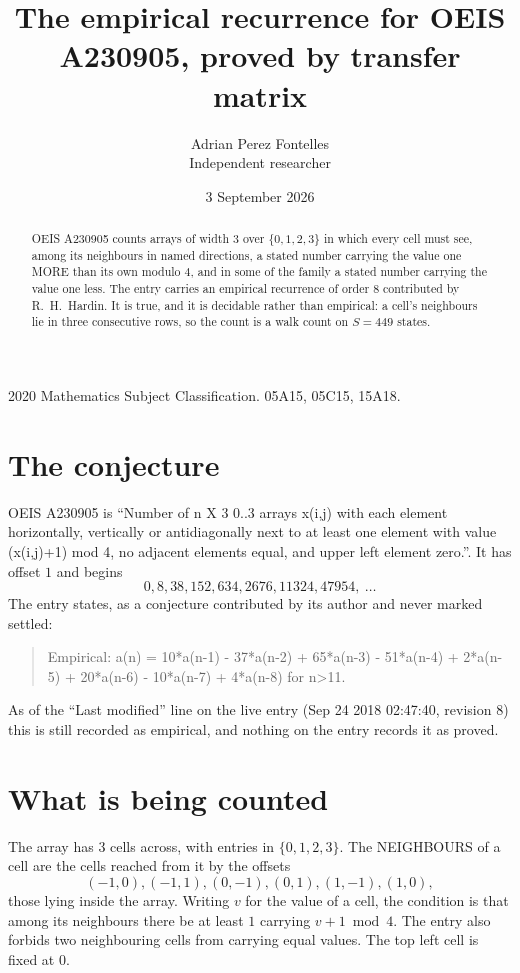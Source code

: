 \documentclass[11pt,a4paper]{article}
\title{The empirical recurrence for OEIS A230905, proved by transfer matrix}
\author{Adrian Perez Fontelles\\ \small Independent researcher}
\date{3 September 2026}
\theoremstyle{plain}
\theoremstyle{definition}
\begin{document}
\maketitle

\begin{abstract}
OEIS A230905 counts arrays of width $3$ over $\{0,1,2,3\}$ in which every cell must see, among its
neighbours in named directions, a stated number carrying the value one MORE than its own
modulo $4$, and in some of the family a stated number carrying the value one less. The entry
carries an empirical recurrence of order $8$ contributed by R.~H.~Hardin. It is true, and
it is decidable rather than empirical: a cell's neighbours lie in three consecutive rows, so
the count is a walk count on $S=449$ states.
\end{abstract}

\noindent\small 2020 Mathematics Subject Classification. 05A15, 05C15, 15A18.\normalsize

\section{The conjecture}

OEIS A230905 is ``Number of n X 3 0..3 arrays x(i,j) with each element horizontally, vertically or antidiagonally next to at least one element with value (x(i,j)+1) mod 4, no adjacent elements equal, and upper left element zero.''. It has offset $1$ and begins
\[
0, 8, 38, 152, 634, 2676, 11324, 47954,\ \dots
\]
The entry states, as a conjecture contributed by its author and never marked settled:
\begin{quote}
Empirical: a(n) = 10*a(n-1) - 37*a(n-2) + 65*a(n-3) - 51*a(n-4) + 2*a(n-5) + 20*a(n-6) - 10*a(n-7) + 4*a(n-8) for n>11.
\end{quote}
As of the ``Last modified'' line on the live entry (Sep 24 2018 02:47:40, revision 8) this is still
recorded as empirical, and nothing on the entry records it as proved.

\section{What is being counted}

The array has $3$ cells across, with entries in $\{0,1,2,3\}$. The NEIGHBOURS of a cell are the
cells reached from it by the offsets
\[
(-1,0), (-1,1), (0,-1), (0,1), (1,-1), (1,0),
\]
those lying inside the array. Writing $v$ for the value of a cell, the condition is that among
its neighbours there be at least $1$ carrying $v+1 \bmod 4$. The entry also forbids two neighbouring cells from carrying equal values. The top left
cell is fixed at $0$.
\end{document}
